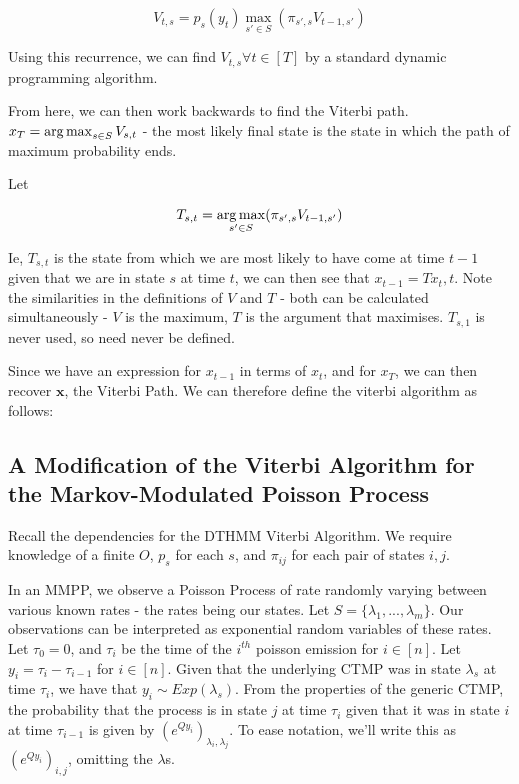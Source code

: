 $$
V_{t,s} = p_s(y_t) \max_{s'\in S} (\pi_{s',s}V_{t-1,s'})
$$

Using this recurrence, we can find $V_{t,s} \forall t \in [T]$ by a standard dynamic programming algorithm.

From here, we can then work backwards to find the Viterbi path. $x_T = \operatorname*{arg\,max}_{s \in S} V_{s,t}$ - the most likely final state is the state in which the path of maximum probability ends.

Let
 
$$
T_{s,t} = \operatorname*{arg\,max}_{s'\in S}(\pi_{s',s}V_{t-1,s'})
$$

Ie, $T_{s,t}$ is the state from which we are most likely to have come at time $t-1$ given that we are in state $s$ at time $t$, we can then see that $x_{t-1} = T{x_t,t}$. Note the similarities in the definitions of $V$ and $T$ - both can be calculated simultaneously - $V$ is the maximum, $T$ is the argument that maximises. $T_{s,1}$ is never used, so need never be defined. 

Since we have an expression for $x_{t-1}$ in terms of $x_t$, and for $x_T$, we can then recover $\mathbf{x}$, the Viterbi Path. We can therefore define the viterbi algorithm as follows:


\subsection{A Modification of the Viterbi Algorithm for the Markov-Modulated Poisson Process}

Recall the dependencies for the DTHMM Viterbi Algorithm. We require knowledge of a finite $O$, $p_s$ for each $s$, and $\pi_{ij}$ for each pair of states $i,j$.

In an MMPP, we observe a Poisson Process of rate randomly varying between various known rates - the rates being our states. Let $S = \{\lambda_1,...,\lambda_m\}$. Our observations can be interpreted as exponential random variables of these rates. Let $\tau_0 = 0$, and $\tau_i$ be the time of the $i^{th}$ poisson emission for $i \in [n]$. Let $y_i = \tau_i-\tau_{i-1}$ for $i \in [n]$. Given that the underlying CTMP was in state $\lambda_s$ at time $\tau_i$, we have that $y_i \sim Exp (\lambda_s)$. From the properties of the generic CTMP, the probability that the process is in state $j$ at time $\tau_i$ given that it was in state $i$ at time $\tau_{i-1}$ is given by $(e^{Qy_i})_{\lambda_{i},\lambda_{j}}$. To ease notation, we'll write this as $(e^{Qy_i})_{i,j}$, omitting the $\lambda$s.


